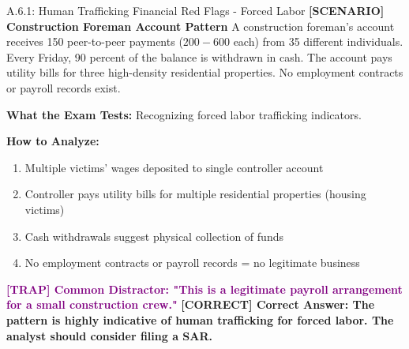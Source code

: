 \documentclass[11pt,a4paper]{beamer}
\newcommand{\trap}[1]{\textcolor{purple}{\textbf{[TRAP] #1}}}
\newcommand{\correct}[1]{\textcolor{green!50!black}{\textbf{[CORRECT] #1}}}
\newcommand{\scenario}[1]{\textcolor{blue!70!black}{\textbf{[SCENARIO] #1}}}
\begin{document}
	\begin{frame}{A.6.1: Human Trafficking Financial Red Flags - Forced Labor}
		\scenario{Construction Foreman Account Pattern}
		A construction foreman's account receives 150 peer-to-peer payments ($200-$600 each) from 35 different individuals. Every Friday, 90 percent of the balance is withdrawn in cash. The account pays utility bills for three high-density residential properties. No employment contracts or payroll records exist.
		
		\vspace{0.1cm}
		\textbf{What the Exam Tests:} Recognizing forced labor trafficking indicators.
		
		\vspace{0.1cm}
		\textbf{How to Analyze:}
		\begin{enumerate}
			\item Multiple victims' wages deposited to single controller account
			\item Controller pays utility bills for multiple residential properties (housing victims)
			\item Cash withdrawals suggest physical collection of funds
			\item No employment contracts or payroll records = no legitimate business
		\end{enumerate}
		
		\trap{Common Distractor: "This is a legitimate payroll arrangement for a small construction crew."}
		\correct{Correct Answer: The pattern is highly indicative of human trafficking for forced labor. The analyst should consider filing a SAR.}
	\end{frame}
	
\end{document}
